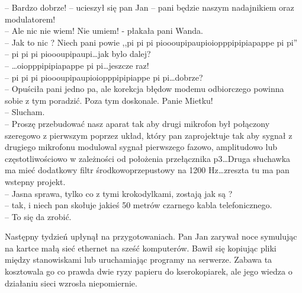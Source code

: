 \documentclass[a4paper,polish,titlepage,12pt]{article}
\begin{document}
-- Bardzo dobrze! -- ucieszył się pan Jan -- pani będzie naszym nadajnikiem oraz modulatorem!\\
-- Ale nic nie wiem! Nie umiem! - płakała pani Wanda.\\
-- Jak to nic ? Niech pani powie ,,pi pi pi pioooupipaupioiopppipipiapappe pi pi''\\
-- pi pi pi pioooupipaupi\dots jak bylo dalej?\\
-- \dots oiopppipipiapappe pi pi\dots jeszcze raz!\\
-- pi pi pi pioooupipaupioiopppipipiappe pi pi\dots dobrze?\\
-- Opuściła pani jedno pa, ale korekcja błędow modemu odbiorczego powinna sobie z tym poradzić. Poza tym doskonale. Panie Mietku!\\
-- Slucham.\\
-- Proszę przebudować nasz aparat tak aby drugi mikrofon był połączony szeregowo z pierwszym poprzez układ, który pan zaprojektuje tak aby sygnał z 
drugiego mikrofonu modulowal sygnał pierwszego fazowo, amplitudowo lub częstotliwościowo w zależności od położenia przełącznika p3\dots Druga słuchawka
 ma mieć dodatkowy filtr środkowoprzepustowy na 1200 Hz\dots zreszta tu ma pan wstepny projekt.\\
-- Jasna sprawa, tylko co z tymi krokodylkami, zostają jak są ?\\
-- tak, i niech pan skołuje jakieś 50 metrów czarnego kabla telefonicznego.\\
-- To się da zrobić.

Następny tydzień upłynął na przygotowaniach. Pan Jan zarywał noce symulując na kartce małą sieć ethernet na sześć komputerów. Bawił się kopiując pliki między stanowiskami lub 
uruchamiając programy na serwerze. Zabawa ta kosztowala go co prawda dwie ryzy papieru do kserokopiarek, ale jego wiedza o działaniu sieci wzrosła niepomiernie.
\end{document}
